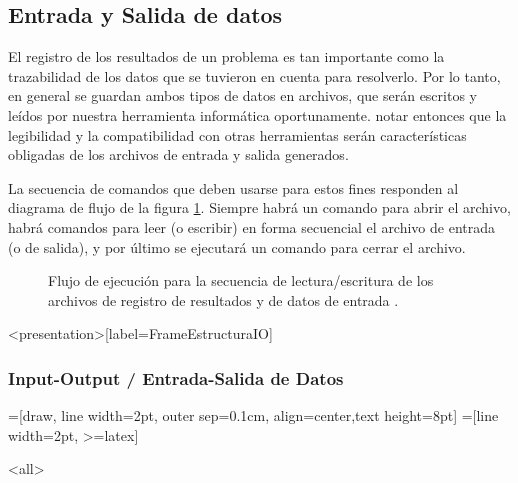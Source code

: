 \subsection{Entrada y Salida de datos}


El registro de los resultados de un problema es tan 
importante como la trazabilidad de los datos 
que se tuvieron en cuenta para resolverlo. Por lo tanto, 
en general se guardan ambos tipos de datos en archivos, 
que serán escritos y leídos por nuestra herramienta 
informática oportunamente. notar entonces que la legibilidad
y la compatibilidad con otras herramientas 
serán características obligadas de los archivos
de entrada y salida generados.

La secuencia de comandos que deben usarse para estos
fines responden al diagrama de flujo de la figura
\ref{FigFlujoIO}. Siempre habrá un comando para 
abrir el archivo, habrá comandos para leer (o 
escribir) en forma secuencial  el archivo de entrada
(o de salida), y por último se ejecutará un comando 
para cerrar el archivo.

\begin{figure}
\caption{Flujo de ejecución para la secuencia de 
lectura/escritura de los archivos de registro de resultados
y de datos de entrada \label{FigFlujoIO}.}
\end{figure}

\mode*


\begin{frame}<presentation>[label=FrameEstructuraIO]
\frametitle{Input-Output / Entrada-Salida de Datos}
=[draw, line width=2pt,
  outer sep=0.1cm, align=center,text height=8pt]
=[line width=2pt, >=latex]

\end{frame}


\mode<all>
